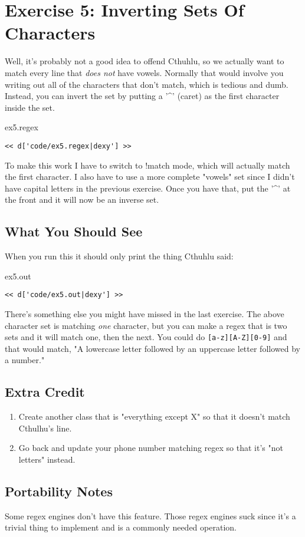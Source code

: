 \chapter{Exercise 5: Inverting Sets Of Characters}

Well, it's probably not a good idea to offend Cthuhlu, so we actually want
to match every line that \emph{does not} have vowels.  Normally that would
involve you writing out all of the characters that don't match, which is
tedious and dumb.  Instead, you can invert the set by putting a '^' (caret)
as the first character inside the set.

\begin{code}{ex5.regex}
\begin{Verbatim}
<< d['code/ex5.regex|dexy'] >>
\end{Verbatim}
\end{code}

To make this work I have to switch to !match mode, which will actually
match the first character.  I also have to use a more complete "vowels"
set since I didn't have capital letters in the previous exercise.  Once
you have that, put the '^' at the front and it will now be an inverse
set.

\section{What You Should See}

When you run this it should only print the thing Cthuhlu said:

\begin{code}{ex5.out}
\begin{Verbatim}
<< d['code/ex5.out|dexy'] >>
\end{Verbatim}
\end{code}

There's something else you might have missed in the last exercise.
The above character set is matching \emph{one} character, but you can
make a regex that is two sets and it will match one, then the next.
You could do \verb|[a-z][A-Z][0-9]| and that would match, "A lowercase
letter followed by an uppercase letter followed by a number."

\section{Extra Credit}

\begin{enumerate}
\item Create another class that is "everything except X" so that it
    doesn't match Cthulhu's line.
\item Go back and update your phone number matching regex so that it's
    "not letters" instead.
\end{enumerate}

\section{Portability Notes}

Some regex engines don't have this feature. Those regex engines suck
since it's a trivial thing to implement and is a commonly needed operation.

